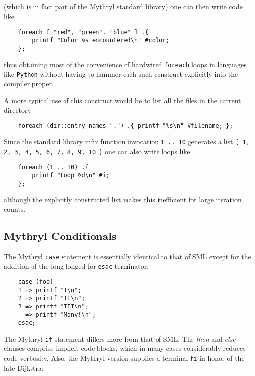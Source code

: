 (which is in fact part of the Mythryl standard library) one can then write 
code like

\begin{verbatim}
    foreach [ "red", "green", "blue" ] .{
        printf "Color %s encountered\n" #color;
    };
\end{verbatim}

thus obtaining most of the convenience of hardwired {\tt foreach} loops 
in languages like {\tt Python} without having to hammer each such construct 
explicitly into the compiler proper.

A more typical use of this construct would be to list all the files in 
the current directory:

\begin{verbatim}
    foreach (dir::entry_names ".") .{ printf "%s\n" #filename; };
\end{verbatim}


Since the standard library infix function invocation {\tt 1 .. 10} generates 
a list {\tt [ 1, 2, 3, 4, 5, 6, 7, 8, 9, 10 ]} one can also write loops like 

\begin{verbatim}
    foreach (1 .. 10) .{
        printf "Loop %d\n" #i;
    };
\end{verbatim}

although the explicitly constructed list makes this inefficient for large 
iteration counts.

\cutend*

\subsection{Mythryl Conditionals}

The Mythryl {\tt case} statement is essentially identical to that of SML 
except for the addition of the long longed-for {\tt esac} terminator:

\begin{verbatim}
    case (foo)
    1 => printf "I\n";
    2 => printf "II\n";
    3 => printf "III\n";
    _ => printf "Many!\n";
    esac;
\end{verbatim}

The Mythryl {\tt if} statement differs more from that of SML. 
The {\it then} and {\it else} clauses comprise implicit code 
blocks, which in many cases considerably reduces code verbosity. 
Also, the Mythryl version supplies a terminal {\tt fi} in honor 
of the late Dijkstra:

